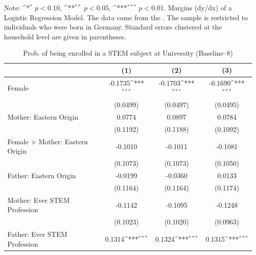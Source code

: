 \documentclass[a4paper, oneside, hyperfootnotes = false]{article}
\def\sym#1{\ifmmode^{#1}\else\(^{#1}\)\fi}
\begin{document}
{\begin{table}[ht]
\begin{center}
		\vspace{2mm}
		
		\parbox{10cm}{
			\linespread{1}\footnotesize Note: \sym{*} \(p<0.10\), \sym{**} \(p<0.05\), \sym{***} \(p<0.01\). Margins (dy/dx) of a Logistic Regression Model. The data come from the \cite{SOEP2023}. The sample is restricted to individuals who were born in Germany. Standard errors clustered at the household level are given in parentheses.}
		
	\end{center}
\end{table}

\begin{table}[ht]
	\caption[STEM subject at University (Baseline--8)]{Prob. of being enrolled in a STEM subject at University (Baseline--8)}
	\label{tab:baseline--8}
	\begin{center}
		\begin{tabular}{l*{3}{c}}
			\toprule
			&\multicolumn{1}{c}{(1)}         &\multicolumn{1}{c}{(2)}         &\multicolumn{1}{c}{(3)}         \\
			\midrule
			Female              &     -0.1735\sym{***}&     -0.1703\sym{***}&     -0.1690\sym{***}\\
			&    (0.0499)         &    (0.0497)         &    (0.0495)         \\
			\addlinespace
			Mother: Eastern Origin&      0.0774         &      0.0897         &      0.0784         \\
			&    (0.1192)         &    (0.1188)         &    (0.1092)         \\
			\addlinespace
			Female $\times$ Mother: Eastern Origin&     -0.1010         &     -0.1011         &     -0.1081         \\
			&    (0.1073)         &    (0.1073)         &    (0.1050)         \\
			\addlinespace
			Father: Eastern Origin&     -0.0199         &     -0.0360         &      0.0133         \\
			&    (0.1164)         &    (0.1164)         &    (0.1174)         \\
			\addlinespace
			Mother: Ever STEM Profession&     -0.1142         &     -0.1095         &     -0.1248         \\
			&    (0.1023)         &    (0.1020)         &    (0.0963)         \\
			\addlinespace
			Father: Ever STEM Profession&      0.1314\sym{***}&      0.1324\sym{***}&      0.1315\sym{***}\\

\end{tabular}
\end{center}
\end{table}}
\end{document}

